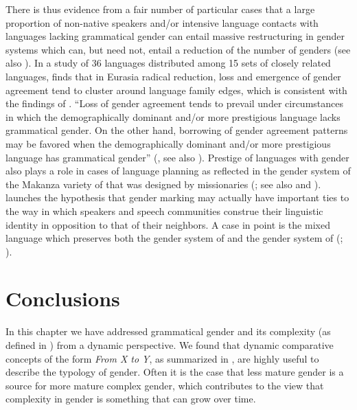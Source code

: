 \documentclass[output=collectionpaper]{langsci/langscibook}
\begin{document}
\largerpage
There is thus evidence from a fair number of particular cases that a large proportion of non-native speakers and/or intensive language contacts with languages lacking grammatical gender can entail massive restructuring in gender systems which can, but need not, entail a reduction of the number of genders (see also \citealt[24]{Trudgill2011}). In a study of 36 languages distributed among 15 sets of closely related languages, \cite{DiGarboinpreparation} finds that in Eurasia radical reduction, loss and emergence of gender agreement tend to cluster around language family edges, which is consistent with the findings of \cite{Nichols2003}. ``Loss of gender agreement tends to prevail under circumstances in which the demographically dominant and/or more prestigious language lacks grammatical gender. On the other hand, borrowing of gender agreement patterns may be favored when the demographically dominant and/or more prestigious language has grammatical gender'' (\citealt{DiGarboinpreparation}, see also ). Prestige of languages with gender also plays a role in cases of language planning as reflected in the gender system of the Makanza variety of  that was designed by missionaries (\citealt{Meeuwis2013}; see also \citealt{DiGarboinpreparation} and ). \cite{DiGarboinpreparation} launches the hypothesis that gender marking may actually have important ties to the way in which speakers and speech communities construe their linguistic identity in opposition to that of their neighbors. A case in point is the mixed language  which preserves both the gender system of  and the gender system of  (\citealt{Bakker1997}; \citealt{DiGarboinpreparation}).


\section{Conclusions}
\label{sec:WDG:12}

In this chapter we have addressed grammatical gender and its complexity (as defined in ) from a dynamic perspective. We found that dynamic comparative concepts of the form \textit{From X to Y}, as summarized in , are highly useful to describe the typology of gender. Often it is the case that less mature gender is a source for more mature complex gender, which contributes to the view that complexity in gender is something that can grow over time.
\end{document}
